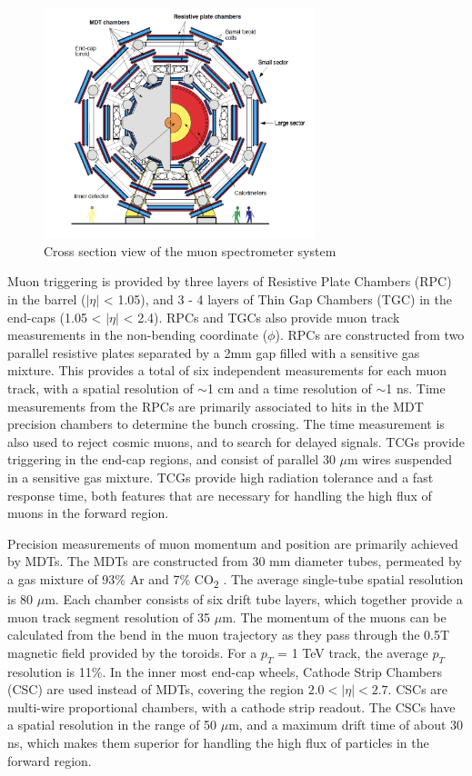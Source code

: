 \begin{figure}
        \centering
	\includegraphics[width=0.7\textwidth]{figures/ch4/muonSpec.png}
	\caption{Cross section view of the muon spectrometer system \cite{muon_tdr} }
	\label{fig:muonSpec}
\end{figure}

Muon triggering is provided by three layers of Resistive Plate Chambers (RPC) in the barrel ($|\eta|$ < 1.05), and 3 - 4 layers of Thin Gap Chambers (TGC) in the end-caps (1.05 < $|\eta|$ < 2.4). RPCs and TGCs also provide muon track measurements in the non-bending coordinate ($\phi$). RPCs are constructed from two parallel resistive plates separated by a 2mm gap filled with a sensitive gas mixture. This provides a total of six independent measurements for each muon track, with a spatial resolution of $\sim$1 cm and a time resolution of $\sim$1 ns. Time measurements from the RPCs are primarily associated to hits in the MDT precision chambers to determine the bunch crossing. The time measurement is also used to reject cosmic muons, and to search for delayed signals. TCGs provide triggering in the end-cap regions, and consist of parallel 30 $\mu$m wires suspended in a sensitive gas mixture. TCGs provide high radiation tolerance and a fast response time, both features that are necessary for handling the high flux of muons in the forward region.\par

Precision measurements of muon momentum and position are primarily achieved by MDTs. The MDTs are constructed from 30 mm diameter tubes, permeated by a gas mixture of 93\% Ar and 7\% CO\textsubscript{2}  \cite{muon_spec}. The average single-tube spatial resolution is 80 $\mu$m. Each chamber consists of six drift tube layers, which together provide a muon track segment resolution of 35 $\mu$m. The momentum of the muons can be calculated from the bend in the muon trajectory as they pass through the 0.5T magnetic field provided by the toroids. For a $p_T$ = 1 TeV track, the average $p_T$ resolution is 11\%. In the inner most end-cap wheels, Cathode Strip Chambers (CSC) are used instead of MDTs, covering the region $2.0 < |\eta| < 2.7$. CSCs are multi-wire proportional chambers, with a cathode strip readout. The CSCs have a spatial resolution in the range of 50 $\mu$m, and a maximum drift time of about 30 ns, which makes them superior for handling the high flux of particles in the forward region. 

